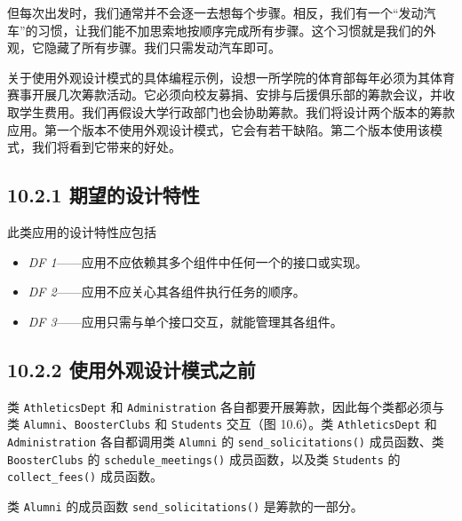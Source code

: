 但每次出发时，我们通常并不会逐一去想每个步骤。相反，我们有一个“发动汽车”的习惯，让我们能不加思索地按顺序完成所有步骤。这个习惯就是我们的外观，它隐藏了所有步骤。我们只需发动汽车即可。

关于使用外观设计模式的具体编程示例，设想一所学院的体育部每年必须为其体育赛事开展几次筹款活动。它必须向校友募捐、安排与后援俱乐部的筹款会议，并收取学生费用。我们再假设大学行政部门也会协助筹款。我们将设计两个版本的筹款应用。第一个版本不使用外观设计模式，它会有若干缺陷。第二个版本使用该模式，我们将看到它带来的好处。

\subsection{10.2.1 期望的设计特性}

此类应用的设计特性应包括

\begin{itemize}
\item \emph{DF 1}——应用不应依赖其多个组件中任何一个的接口或实现。
\item \emph{DF 2}——应用不应关心其各组件执行任务的顺序。
\item \emph{DF 3}——应用只需与单个接口交互，就能管理其各组件。
\end{itemize}

\subsection{10.2.2 使用外观设计模式之前}

类 \texttt{Athletics\allowbreak{}Dept} 和 \texttt{Administration} 各自都要开展筹款，因此每个类都必须与类 \texttt{Alumni}、\texttt{Booster\allowbreak{}Clubs} 和 \texttt{Students} 交互（图 10.6）。类 \texttt{Athletics\allowbreak{}Dept} 和 \texttt{Administration} 各自都调用类 \texttt{Alumni} 的 \texttt{send\_\allowbreak{}solicitations(\allowbreak{})\allowbreak{}} 成员函数、类 \texttt{Booster\allowbreak{}Clubs} 的 \texttt{schedule\_\allowbreak{}meetings(\allowbreak{})\allowbreak{}} 成员函数，以及类 \texttt{Students} 的 \texttt{collect\_\allowbreak{}fees(\allowbreak{})\allowbreak{}} 成员函数。


类 \texttt{Alumni} 的成员函数 \texttt{send\_\allowbreak{}solicitations(\allowbreak{})\allowbreak{}} 是筹款的一部分。

